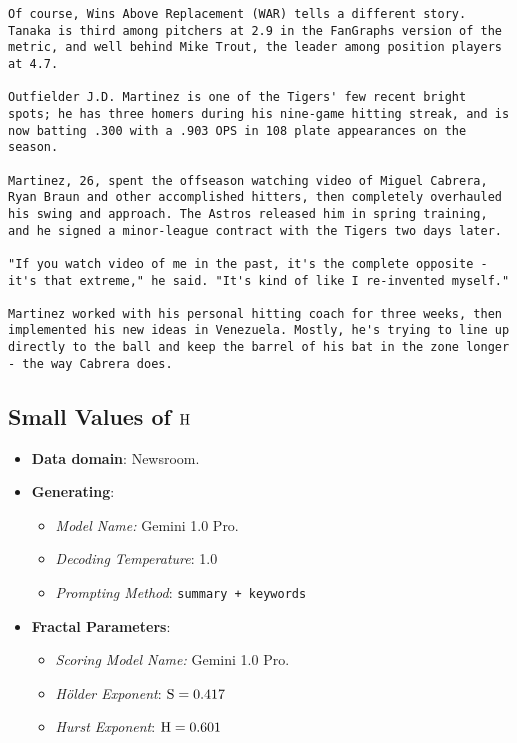 \begin{lstlisting}
Of course, Wins Above Replacement (WAR) tells a different story. Tanaka is third among pitchers at 2.9 in the FanGraphs version of the metric, and well behind Mike Trout, the leader among position players at 4.7.

Outfielder J.D. Martinez is one of the Tigers' few recent bright spots; he has three homers during his nine-game hitting streak, and is now batting .300 with a .903 OPS in 108 plate appearances on the season.

Martinez, 26, spent the offseason watching video of Miguel Cabrera, Ryan Braun and other accomplished hitters, then completely overhauled his swing and approach. The Astros released him in spring training, and he signed a minor-league contract with the Tigers two days later.

"If you watch video of me in the past, it's the complete opposite - it's that extreme," he said. "It's kind of like I re-invented myself."

Martinez worked with his personal hitting coach for three weeks, then implemented his new ideas in Venezuela. Mostly, he's trying to line up directly to the ball and keep the barrel of his bat in the zone longer - the way Cabrera does.
\end{lstlisting}


\newpage
\subsection{Small Values of $\mathrm{H}$}
\begin{itemize}
    \item\textbf{Data domain}: Newsroom.
    \item\textbf{Generating}: 
        \begin{itemize}
            \item\emph{Model Name:} Gemini 1.0 Pro.
            \item\emph{Decoding Temperature}: 1.0
            \item\emph{Prompting Method}: \verb|summary + keywords|
        \end{itemize}
    \item\textbf{Fractal Parameters}: 
        \begin{itemize}
            \item\emph{Scoring Model Name:} Gemini 1.0 Pro.
            \item\emph{H\"older Exponent}: $\mathrm{S}=0.417$
            \item\emph{Hurst Exponent}:  $\mathrm{H}=0.601$
        \end{itemize}
\end{itemize}



